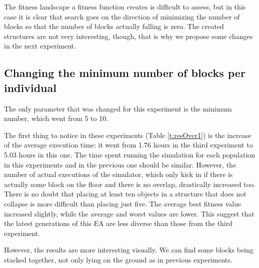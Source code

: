 \documentclass[a4paper,twoside]{article}
\begin{document}
The fitness landscape a fitness function creates is difficult to
assess, but in this case it is clear that search goes on the direction
of minimizing the number of blocks so that the number of blocks
actually falling is zero. The created structures are not very
interesting, though, that is why we propose some changes in the next experiment.
\subsection{Changing the minimum number of blocks per individual}\label{E4}

The only parameter that was changed for this experiment is the minimum
number, which went from 5 to 10. 

The first thing to notice in these experiments (Table \ref{t:resOver1}) is the 
increase of the average execution time: it went from 1.76 hours in the third 
experiment to 5.03 hours in this one. The time spent running the simulation for 
each population in this experiments and in the previous one should be similar. 
However, the number of actual executions of the simulator, which only
kick in if there is actually some block on the floor and there is no overlap, drastically increased too. There is no doubt 
that placing at least ten objects in a structure that does not
collapse is more difficult than placing just five. The average 
best fitness value increased slightly, while the average and worst values are lower. This suggest that the latest generations of this EA are less diverse than those 
from the third experiment.

However, the results are more interesting visually. We can find some blocks 
being stacked together, not only lying on the ground as in previous 
experiments.%

\end{document}
